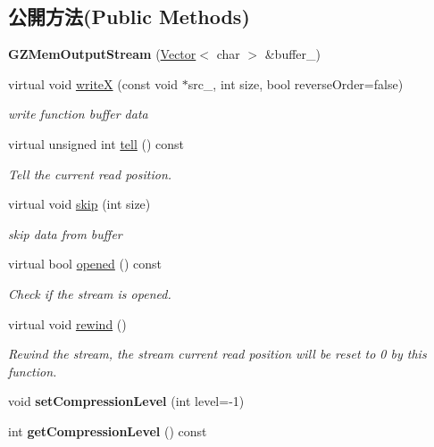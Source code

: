 \subsection*{公開方法(Public Methods)}
\begin{DoxyCompactItemize}
\item 
{\bfseries G\+Z\+Mem\+Output\+Stream} (\hyperlink{class_magnum_1_1_vector}{Vector}$<$ char $>$ \&buffer\+\_\+)\hypertarget{class_magnum_1_1_g_z_mem_output_stream_aafed9fa86232478cef5d2bb6b95334e0}{}\label{class_magnum_1_1_g_z_mem_output_stream_aafed9fa86232478cef5d2bb6b95334e0}

\item 
virtual void \hyperlink{class_magnum_1_1_g_z_mem_output_stream_a0b8b2f415c3a52209e3cb3785c20246d}{writeX} (const void $\ast$src\+\_\+, int size, bool reverse\+Order=false)
\begin{DoxyCompactList}\small\item\em write function buffer data \end{DoxyCompactList}\item 
virtual unsigned int \hyperlink{class_magnum_1_1_g_z_mem_output_stream_ac7fcdc506e49c9a9b6dd353b54823328}{tell} () const 
\begin{DoxyCompactList}\small\item\em Tell the current read position. \end{DoxyCompactList}\item 
virtual void \hyperlink{class_magnum_1_1_g_z_mem_output_stream_a70d1d6cc3b11e7d8d0ed8979d25e7afb}{skip} (int size)
\begin{DoxyCompactList}\small\item\em skip data from buffer \end{DoxyCompactList}\item 
virtual bool \hyperlink{class_magnum_1_1_g_z_mem_output_stream_a6a9bd2d089206b1f9cf4aee0bc10befa}{opened} () const 
\begin{DoxyCompactList}\small\item\em Check if the stream is opened. \end{DoxyCompactList}\item 
virtual void \hyperlink{class_magnum_1_1_g_z_mem_output_stream_ae02a0dafad76687486fbf97173de0861}{rewind} ()
\begin{DoxyCompactList}\small\item\em Rewind the stream, the stream current read position will be reset to 0 by this function. \end{DoxyCompactList}\item 
void {\bfseries set\+Compression\+Level} (int level=-\/1)\hypertarget{class_magnum_1_1_g_z_mem_output_stream_aa43fbcf7419e5abffe2e1943acfb2c7f}{}\label{class_magnum_1_1_g_z_mem_output_stream_aa43fbcf7419e5abffe2e1943acfb2c7f}

\item 
int {\bfseries get\+Compression\+Level} () const \hypertarget{class_magnum_1_1_g_z_mem_output_stream_ae0667f7d8d8cc1662192bb4cbf475918}{}\label{class_magnum_1_1_g_z_mem_output_stream_ae0667f7d8d8cc1662192bb4cbf475918}

\end{DoxyCompactItemize}
